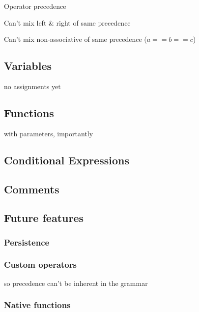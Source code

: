             Operator precedence
            
            Can't mix left \& right of same precedence
            
            Can't mix non-associative of same precedence ($a==b==c$)
        
        \subsection{Variables}
            
            no assignments yet
        
        \subsection{Functions}
        
            with parameters, importantly
        
        \subsection{Conditional Expressions}
        
        \subsection{Comments}
        
        \subsection{Future features}
            
            \subsubsection{Persistence}
                
            \subsubsection{Custom operators}
                
                so precedence can't be inherent in the grammar
                
            \subsubsection{Native functions}
                
